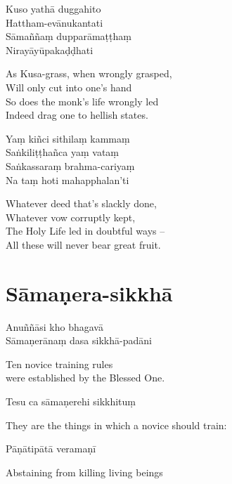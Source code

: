 Kuso yathā duggahito\\
Hattham-evānukantati\\
Sāmaññaṃ dupparāmaṭṭhaṃ\\
Nirayāyūpakaḍḍhati

\begin{english}
  As Kusa-grass, when wrongly grasped,\\
  Will only cut into one's hand\\
  So does the monk's life wrongly led\\
  Indeed drag one to hellish states.
\end{english}

Yaṃ kiñci sithilaṃ kammaṃ\\
Saṅkiliṭṭhañca yaṃ vataṃ\\
Saṅkassaraṃ brahma-cariyaṃ\\
Na taṃ hoti mahapphalan'ti

\clearpage

\begin{english}
  Whatever deed that's slackly done,\\
  Whatever vow corruptly kept,\\
  The Holy Life led in doubtful ways --\\
  All these will never bear great fruit. 
\end{english}

\section{Sāmaṇera-sikkhā}


Anuññāsi kho bhagavā\\
Sāmaṇerānaṃ dasa sikkhā-padāni

\begin{cprenglish}
  Ten novice training rules\\
  were established by the Blessed One.
\end{cprenglish}

Tesu ca sāmaṇerehi sikkhituṃ

\begin{cprenglish}
  They are the things in which a novice should train:
\end{cprenglish}

Pāṇātipātā veramaṇī

\begin{cprenglish}
  Abstaining from killing living beings
\end{cprenglish}

